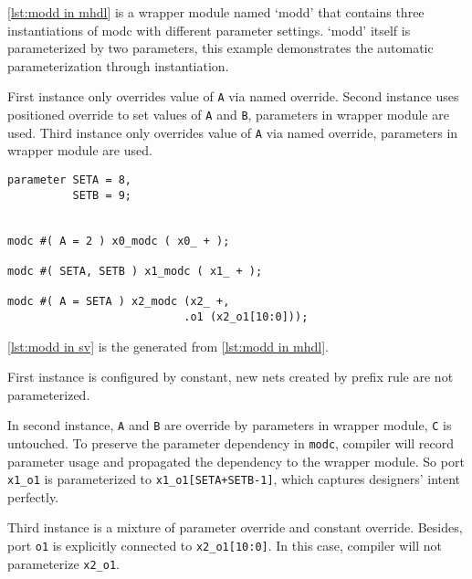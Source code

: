 \autoref{lst:modd in mhdl} is a wrapper module named `modd' that 
contains three instantiations of modc with different
parameter settings. `modd' itself is parameterized by two parameters, this 
example demonstrates the automatic parameterization through instantiation.

First instance only overrides value of \texttt{A} via named override. 
Second instance uses positioned override to set values of \texttt{A} and \texttt{B}, 
parameters in wrapper module are used. 
Third instance only overrides value of \texttt{A} via named override, 
parameters in wrapper module are used. 


\begin{minipage}[t]{.45\textwidth}
\begin{lstlisting}[caption={Instantiation}, label={lst:modd in mhdl}]
parameter SETA = 8,
          SETB = 9;


modc #( A = 2 ) x0_modc ( x0_ + );

modc #( SETA, SETB ) x1_modc ( x1_ + );

modc #( A = SETA ) x2_modc (x2_ +,
                           .o1 (x2_o1[10:0]));
\end{lstlisting}

\autoref{lst:modd in sv} is the generated \sv{} from \autoref{lst:modd in mhdl}.

First instance is configured by constant, new nets created by prefix rule are not
parameterized. 

In second instance, \texttt{A} and \texttt{B} are override by parameters in wrapper
module, \texttt{C} is untouched. To preserve the parameter dependency in \texttt{modc}, 
compiler will record parameter usage and propagated the dependency to the wrapper module. 
So port \verb|x1_o1| is parameterized to \verb|x1_o1[SETA+SETB-1]|, which captures designers'
intent perfectly. 

Third instance is a mixture of parameter override and constant override. Besides, port 
\verb|o1| is explicitly connected to \verb|x2_o1[10:0]|. In this case, compiler will not 
parameterize \verb|x2_o1|. 
\end{minipage}
\hspace{1ex}
